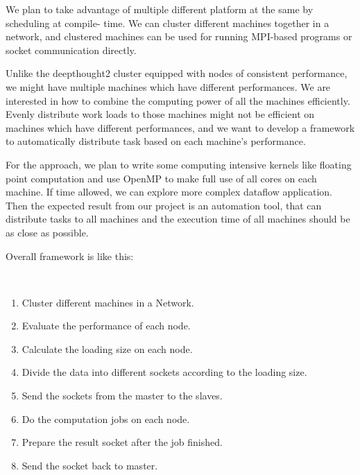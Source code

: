 We plan to take advantage of multiple different platform at the same by
scheduling at compile- time. We can cluster different machines together in a
network, and clustered machines can be used for running MPI-based programs or
socket communication directly.

Unlike the deepthought2 cluster equipped with nodes of consistent performance,
we might have multiple machines which have different performances. We are
interested in how to combine the computing power of all the machines
efficiently. Evenly distribute work loads to those machines might not be
efficient on machines which have different performances, and we want to
develop a framework to automatically distribute task based on each machine's
performance.

For the approach, we plan to write some computing intensive kernels like
floating point computation and use OpenMP to make full use of all cores on
each machine. If time allowed, we can explore more complex dataflow
application. Then the expected result from our project is an automation tool,
that can distribute tasks to all machines and the execution time of all
machines should be as close as possible.

Overall framework is like this:

~\cite{lee2017x3}
\begin{enumerate}
\item Cluster different machines in a Network.
\item Evaluate the performance of each node.
\item Calculate the loading size on each node.
\item Divide the data into different sockets according to the loading size.
\item Send the sockets from the master to the slaves.
\item Do the computation jobs on each node.
\item Prepare the result socket after the job finished.
\item Send the socket back to master.
\end{enumerate}